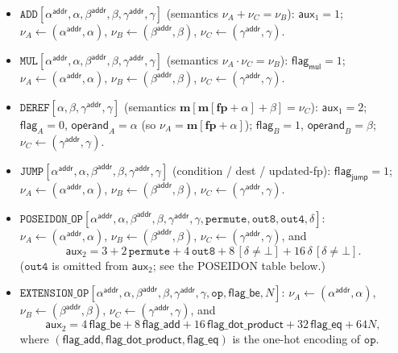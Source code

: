 \documentclass{article}
\theoremstyle{definition}
\begin{document}
\begin{itemize}\setlength\itemsep{4pt}
    \item $\texttt{ADD}[\alpha^\textsf{addr}, \alpha, \beta^\textsf{addr}, \beta, \gamma^\textsf{addr}, \gamma]$ \; (semantics $\nu_A + \nu_C = \nu_B$): $\textsf{aux}_1 = 1$;\; $\nu_A \!\leftarrow\! (\alpha^\textsf{addr}, \alpha)$, $\nu_B \!\leftarrow\! (\beta^\textsf{addr}, \beta)$, $\nu_C \!\leftarrow\! (\gamma^\textsf{addr}, \gamma)$.
    \item $\texttt{MUL}[\alpha^\textsf{addr}, \alpha, \beta^\textsf{addr}, \beta, \gamma^\textsf{addr}, \gamma]$ \; (semantics $\nu_A \cdot \nu_C = \nu_B$): $\textsf{flag}_\textsf{mul} = 1$;\; $\nu_A \!\leftarrow\! (\alpha^\textsf{addr}, \alpha)$, $\nu_B \!\leftarrow\! (\beta^\textsf{addr}, \beta)$, $\nu_C \!\leftarrow\! (\gamma^\textsf{addr}, \gamma)$.
    \item $\texttt{DEREF}[\alpha, \beta, \gamma^\textsf{addr}, \gamma]$ \; (semantics $\textbf{m}[\textbf{m}[\textbf{fp} + \alpha] + \beta] = \nu_C$): $\textsf{aux}_1 = 2$;\; $\textsf{flag}_A = 0$, $\textsf{operand}_A = \alpha$ (so $\nu_A = \textbf{m}[\textbf{fp} + \alpha]$);\; $\textsf{flag}_B = 1$, $\textsf{operand}_B = \beta$;\; $\nu_C \!\leftarrow\! (\gamma^\textsf{addr}, \gamma)$.
    \item $\texttt{JUMP}[\alpha^\textsf{addr}, \alpha, \beta^\textsf{addr}, \beta, \gamma^\textsf{addr}, \gamma]$ \; (condition / dest / updated-fp): $\textsf{flag}_\textsf{jump} = 1$;\; $\nu_A \!\leftarrow\! (\alpha^\textsf{addr}, \alpha)$, $\nu_B \!\leftarrow\! (\beta^\textsf{addr}, \beta)$, $\nu_C \!\leftarrow\! (\gamma^\textsf{addr}, \gamma)$.
    \item $\texttt{POSEIDON\_OP}[\alpha^\textsf{addr}, \alpha, \beta^\textsf{addr}, \beta, \gamma^\textsf{addr}, \gamma, \texttt{permute}, \texttt{out8}, \texttt{out4}, \delta]$: \; $\nu_A \!\leftarrow\! (\alpha^\textsf{addr}, \alpha)$, $\nu_B \!\leftarrow\! (\beta^\textsf{addr}, \beta)$, $\nu_C \!\leftarrow\! (\gamma^\textsf{addr}, \gamma)$, and
    \[
    \textsf{aux}_2 = 3 + 2\,\texttt{permute} + 4\,\texttt{out8} + 8\,[\delta \neq \bot] + 16\, \delta\,[\delta \neq \bot].
    \]
    ($\texttt{out4}$ is omitted from $\textsf{aux}_2$; see the POSEIDON table below.)
    \item $\texttt{EXTENSION\_OP}[\alpha^\textsf{addr}, \alpha, \beta^\textsf{addr}, \beta, \gamma^\textsf{addr}, \gamma, \texttt{op}, \textsf{flag\_be}, N]$: \; $\nu_A \!\leftarrow\! (\alpha^\textsf{addr}, \alpha)$, $\nu_B \!\leftarrow\! (\beta^\textsf{addr}, \beta)$, $\nu_C \!\leftarrow\! (\gamma^\textsf{addr}, \gamma)$, and
    \[
    \textsf{aux}_2 = 4\,\textsf{flag\_be} + 8\,\textsf{flag\_add} + 16\,\textsf{flag\_dot\_product} + 32\,\textsf{flag\_eq} + 64N,
    \]
    where $(\textsf{flag\_add}, \textsf{flag\_dot\_product}, \textsf{flag\_eq})$ is the one-hot encoding of $\texttt{op}$.
\end{itemize}
\end{document}
